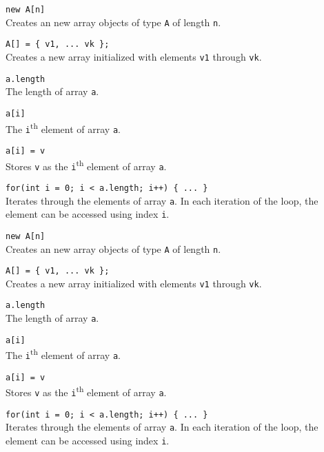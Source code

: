 \documentclass[10pt,twocolumn]{article}
\begin{document}
\begin{description}
\item{\texttt{new A[n]}} \\[.25em]
Creates an new array objects of type \texttt{A} of length
\texttt{n}. 

\item{\texttt{A[] = \{ v1, ... vk \};}} \\[.25em] 
Creates a new array initialized with elements \texttt{v1} through \texttt{vk}. 

\item{\texttt{a.length}} \\[.25em]
The length of array \texttt{a}. 

\item{\texttt{a[i]}} \\[.25em]
The \texttt{i}\textsuperscript{th} element of array \texttt{a}. 

\item{\texttt{a[i] = v}} \\[.25em]
Stores \texttt{v} as the \texttt{i}\textsuperscript{th} element of array \texttt{a}. 

\item{\texttt{for(int i = 0; i < a.length; i++) \{ ... \}}} \\[.25em]
  Iterates through the elements of array \texttt{a}. In each iteration
  of the loop, the element can be accessed using index \texttt{i}.
  
\end{description}

\begin{description}
\item{\texttt{new A[n]}} \\[.25em]
Creates an new array objects of type \texttt{A} of length
\texttt{n}. 

\item{\texttt{A[] = \{ v1, ... vk \};}} \\[.25em] 
Creates a new array initialized with elements \texttt{v1} through \texttt{vk}. 

\item{\texttt{a.length}} \\[.25em]
The length of array \texttt{a}. 

\item{\texttt{a[i]}} \\[.25em]
The \texttt{i}\textsuperscript{th} element of array \texttt{a}. 

\item{\texttt{a[i] = v}} \\[.25em]
Stores \texttt{v} as the \texttt{i}\textsuperscript{th} element of array \texttt{a}. 

\item{\texttt{for(int i = 0; i < a.length; i++) \{ ... \}}} \\[.25em]
  Iterates through the elements of array \texttt{a}. In each iteration
  of the loop, the element can be accessed using index \texttt{i}.
  
\end{description}
\end{document}
